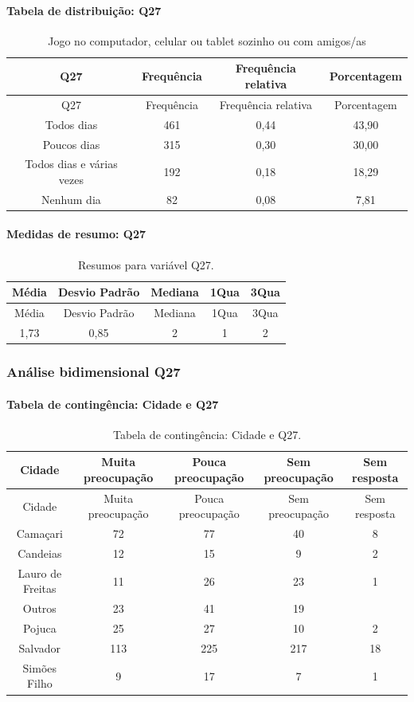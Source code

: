 \documentclass[]{article}
\let\oldparagraph\paragraph
\renewcommand{\paragraph}[1]{\oldparagraph{#1}\mbox{}}
\begin{document}
\hypertarget{tabela-de-distribuiuxe7uxe3o-q27}{%
\paragraph{Tabela de distribuição: Q27}\label{tabela-de-distribuiuxe7uxe3o-q27}}

\begin{longtable}[]{@{}cccc@{}}
\caption{\label{tab:unnamed-chunk-777}Jogo no computador, celular ou tablet sozinho ou com amigos/as}\tabularnewline
\toprule
Q27 & Frequência & Frequência relativa & Porcentagem\tabularnewline
\midrule
\endfirsthead
\toprule
Q27 & Frequência & Frequência relativa & Porcentagem\tabularnewline
\midrule
\endhead
Todos dias & 461 & 0,44 & 43,90\tabularnewline
Poucos dias & 315 & 0,30 & 30,00\tabularnewline
Todos dias e várias vezes & 192 & 0,18 & 18,29\tabularnewline
Nenhum dia & 82 & 0,08 & 7,81\tabularnewline
\bottomrule
\end{longtable}

\hypertarget{medidas-de-resumo-q27}{%
\paragraph{Medidas de resumo: Q27}\label{medidas-de-resumo-q27}}

\begin{longtable}[]{@{}ccccc@{}}
\caption{\label{tab:unnamed-chunk-778}Resumos para variável Q27.}\tabularnewline
\toprule
Média & Desvio Padrão & Mediana & 1Qua & 3Qua\tabularnewline
\midrule
\endfirsthead
\toprule
Média & Desvio Padrão & Mediana & 1Qua & 3Qua\tabularnewline
\midrule
\endhead
1,73 & 0,85 & 2 & 1 & 2\tabularnewline
\bottomrule
\end{longtable}

\cleardoublepage

\hypertarget{anuxe1lise-bidimensional-q27}{%
\subsubsection{Análise bidimensional Q27}\label{anuxe1lise-bidimensional-q27}}

\hypertarget{tabela-de-continguxeancia-cidade-e-q27}{%
\paragraph{Tabela de contingência: Cidade e Q27}\label{tabela-de-continguxeancia-cidade-e-q27}}

\begin{longtable}[]{@{}ccccc@{}}
\caption{\label{tab:unnamed-chunk-779}Tabela de contingência: Cidade e Q27.}\tabularnewline
\toprule
Cidade & Muita preocupação & Pouca preocupação & Sem preocupação & Sem resposta\tabularnewline
\midrule
\endfirsthead
\toprule
Cidade & Muita preocupação & Pouca preocupação & Sem preocupação & Sem resposta\tabularnewline
\midrule
\endhead
Camaçari & 72 & 77 & 40 & 8\tabularnewline
Candeias & 12 & 15 & 9 & 2\tabularnewline
Lauro de Freitas & 11 & 26 & 23 & 1\tabularnewline
Outros & 23 & 41 & 19 &\tabularnewline
Pojuca & 25 & 27 & 10 & 2\tabularnewline
Salvador & 113 & 225 & 217 & 18\tabularnewline
Simões Filho & 9 & 17 & 7 & 1\tabularnewline
\bottomrule
\end{longtable}
\end{document}
